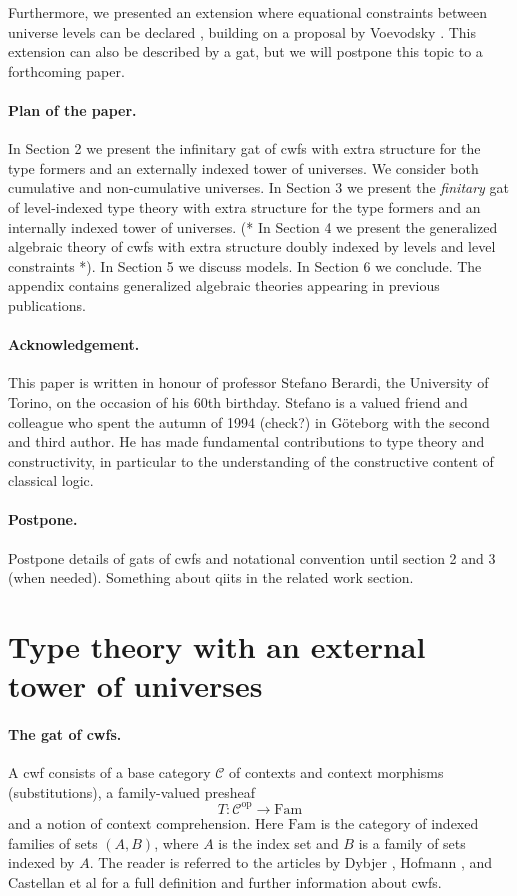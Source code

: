 \documentclass[11pt,a4paper]{article}
\theoremstyle{definition}
\newcommand{\op}{\mathrm{op}}
\def\Fam{\mathrm{Fam}}
\def\C{\mathcal{C}}
\begin{document}
Furthermore, we presented an extension where equational constraints between universe levels can be declared \cite{BezemCDE22}, building on a proposal by Voevodsky \cite{VV}. This extension can also be described by a gat, but we will postpone this topic to a forthcoming paper.

\paragraph{Plan of the paper.} In Section 2 we present the infinitary gat of cwfs with extra structure for the type formers and an externally indexed tower of universes. We consider both cumulative and non-cumulative universes. In Section 3 we present the {\em finitary} gat of level-indexed type theory with extra structure for the type formers and an internally indexed tower of universes. (* In Section 4 we present the generalized algebraic theory of cwfs with extra structure doubly indexed by levels and level constraints *). In Section 5 we discuss models. In Section 6 we conclude. The appendix contains generalized algebraic theories appearing in previous publications. 

\paragraph{Acknowledgement.} This paper is written in honour of professor Stefano Berardi, the University of Torino, on the occasion of his 60th birthday. Stefano is a valued friend and colleague who spent the autumn of 1994 (check?) in Göteborg with the second and third author. He has made fundamental contributions to type theory and constructivity, in particular to the understanding of the constructive content of classical logic.

\paragraph{Postpone.} Postpone details of gats of cwfs and notational convention until section 2 and 3 (when needed). Something about qiits in the related work section.

\section{Type theory with an external tower of universes}

\paragraph{The gat of cwfs.} A cwf consists of a base category $\C$ of contexts and context morphisms (substitutions), a family-valued presheaf
$$
T : \C^\op \to \Fam
$$
and a notion of context comprehension. Here $\Fam$ is the category of indexed families of sets $(A,B)$, where $A$ is the index set and $B$ is a family of sets indexed by $A$. The reader is referred to the articles by Dybjer \cite{dybjer:torino}, Hofmann \cite{hofmann:cambridge}, and Castellan et al \cite{castellan:lambek} for a full definition and further information about cwfs.
\end{document}
